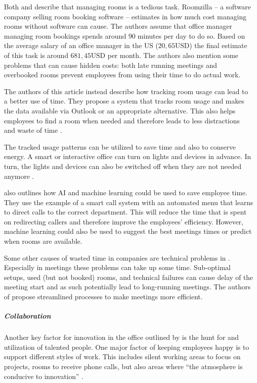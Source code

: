 Both \cite{iotagenda} and \cite{roomzilla9} describe that managing rooms is a tedious task. Roomzilla -- a software company selling room booking software -- estimates in \cite{roomzilla9} how much cost managing rooms without software can cause. The authors assume that office manager managing room bookings spends around 90 minutes per day to do so. Based on the average salary of an office manager in the US (\(20,65\text{USD}\)) the final estimate of this task is around \(681,45\text{USD}\) per month. The authors also mention some problems that can cause hidden costs: both late running meetings and overbooked rooms prevent employees from using their time to do actual work. 

The authors of this article instead describe how tracking room usage can lead to a better use of time. They propose a system that tracks room usage and makes the data available via Outlook or an appropriate alternative. This also helps employees to find a room when needed and therefore leads to less distractions and waste of time \cite{iotagenda}.

The tracked usage patterns can be utilized to save time and also to conserve energy. A smart or interactive office can turn on lights and devices in advance. In turn, the lights and devices can also be switched off when they are not needed anymore \cite{hbcommunications}.


\cite{hbcommunications} also outlines how AI and machine learning could be used to save employee time. They use the example of a smart call system with an automated menu that learns to direct calls to the correct department. This will reduce the time that is spent on redirecting callers and therefore improve the employees' efficiency. However, machine learning could also be used to suggest the best meetings times or predict when rooms are available.

Some other causes of wasted time in companies are technical problems in \cite{roomzilla3}. Especially in meetings these problems can take up some time. Sub-optimal setups, used (but not booked) rooms, and technical failures can cause delay of the meeting start and as such potentially lead to long-running meetings. The authors of \cite{roomzilla3} propose streamlined processes to make meetings more efficient. 

\subparagraph{Collaboration}\label{sec:sda-collaboration}
Another key factor for innovation in the office outlined by \cite{hub13} is the hunt for and utilization of talented people. One major factor of keeping employees happy is to support different styles of work. This includes silent working areas to focus on projects, rooms to receive phone calls, but also areas where ``the atmosphere is conducive to innovation'' \cite{tieto}.

